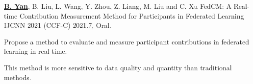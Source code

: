 \begin{cventries}
\cventry
{\underline{\textbf{B. Yan}}, B. Liu, L. Wang, Y. Zhou, Z. Liang, M. Liu and C. Xu} %
{FedCM: A Real-time Contribution Measurement Method for Participants in Federated Learning} %
{IJCNN 2021 (CCF-C)} %
{2021.7, Oral.} %
{
	\begin{cvitems} %
		\item {Propose a method to evaluate and measure participant contributions in federated learning in real-time.}
		\item {This method is more sensitive to data quality and quantity than traditional methods.}
	\end{cvitems}
}


\end{cventries}
